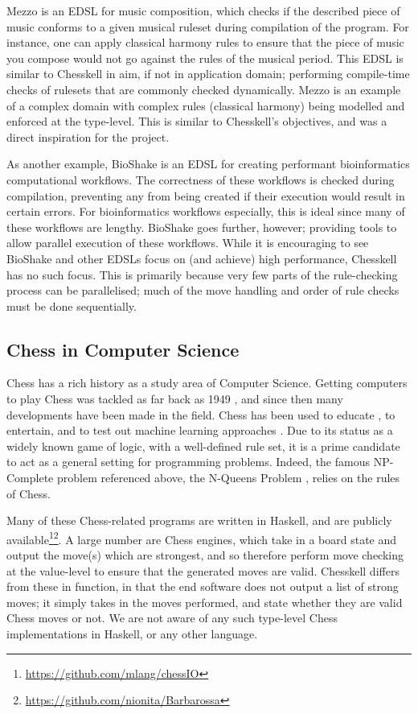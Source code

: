 Mezzo \cite{mezzohaskellsymposium} is an EDSL for music composition, which checks if the described piece of music conforms to a given musical ruleset during compilation of the program. For instance, one can apply classical harmony rules to ensure that the piece of music you compose would not go against the rules of the musical period. This EDSL is similar to Chesskell in aim, if not in application domain; performing compile-time checks of rulesets that are commonly checked dynamically. Mezzo is an example of a complex domain with complex rules (classical harmony) being modelled and enforced at the type-level. This is similar to Chesskell's objectives, and was a direct inspiration for the project.

As another example, BioShake \cite{bioshake} is an EDSL for creating performant bioinformatics computational workflows. The correctness of these workflows is checked during compilation, preventing any from being created if their execution would result in certain errors. For bioinformatics workflows especially, this is ideal since many of these workflows are lengthy. BioShake goes further, however; providing tools to allow parallel execution of these workflows. While it is encouraging to see BioShake and other EDSLs \cite{aplite} focus on (and achieve) high performance, Chesskell has no such focus. This is primarily because very few parts of the rule-checking process can be parallelised; much of the move handling and order of rule checks must be done sequentially.

\subsection{Chess in Computer Science}

Chess has a rich history as a study area of Computer Science. Getting computers to play Chess was tackled as far back as 1949 \cite{1949chess}, and since then many developments have been made in the field. Chess has been used to educate \cite{chesseducation}, to entertain, and to test out machine learning approaches \cite{chessml}. Due to its status as a widely known game of logic, with a well-defined rule set, it is a prime candidate to act as a general setting for programming problems. Indeed, the famous NP-Complete problem referenced above, the N-Queens Problem \cite{nqueensnp}, relies on the rules of Chess.

Many of these Chess-related programs are written in Haskell, and are publicly available\footnote{\url{https://github.com/mlang/chessIO}}\footnote{\url{https://github.com/nionita/Barbarossa}}. A large number are Chess engines, which take in a board state and output the move(s) which are strongest, and so therefore perform move checking at the value-level to ensure that the generated moves are valid. Chesskell differs from these in function, in that the end software does not output a list of strong moves; it simply takes in the moves performed, and state whether they are valid Chess moves or not. We are not aware of any such type-level Chess implementations in Haskell, or any other language.

